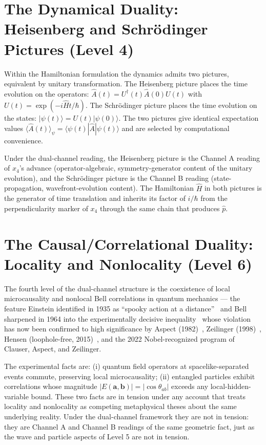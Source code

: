 \documentclass[11pt,a4paper]{article}
\begin{document}
\section{The Dynamical Duality: Heisenberg and Schr\"odinger Pictures (Level 4)}
\label{sec:dynamical}

Within the Hamiltonian formulation the dynamics admits two pictures, equivalent by unitary transformation. The Heisenberg picture places the time evolution on the operators: $\hat{A}(t) = U^\dagger(t) \hat{A}(0) U(t)$ with $U(t) = \exp(-i\hat{H}t/\hbar)$. The Schr\"odinger picture places the time evolution on the states: $|\psi(t)\rangle = U(t)|\psi(0)\rangle$. The two pictures give identical expectation values $\langle \hat{A}(t) \rangle_\psi = \langle \psi(t) | \hat{A} | \psi(t) \rangle$ and are selected by computational convenience.

Under the dual-channel reading, the Heisenberg picture is the Channel A reading of $x_4$'s advance (operator-algebraic, symmetry-generator content of the unitary evolution), and the Schr\"odinger picture is the Channel B reading (state-propagation, wavefront-evolution content). The Hamiltonian $\hat{H}$ in both pictures is the generator of time translation and inherits its factor of $i/\hbar$ from the perpendicularity marker of $x_4$ through the same chain that produces $\hat{p}$.

\section{The Causal/Correlational Duality: Locality and Nonlocality (Level 6)}
\label{sec:causal}

The fourth level of the dual-channel structure is the coexistence of local microcausality and nonlocal Bell correlations in quantum mechanics --- the feature Einstein identified in 1935 as ``spooky action at a distance''~\cite{EPR1935} and Bell sharpened in 1964 into the experimentally decisive inequality~\cite{bell1964} whose violation has now been confirmed to high significance by Aspect (1982)~\cite{aspect1982}, Zeilinger (1998)~\cite{zeilinger1998}, Hensen (loophole-free, 2015)~\cite{hensen2015}, and the 2022 Nobel-recognized program of Clauser, Aspect, and Zeilinger.

The experimental facts are: (i) quantum field operators at spacelike-separated events commute, preserving local microcausality; (ii) entangled particles exhibit correlations whose magnitude $|E(\mathbf{a}, \mathbf{b})| = |\cos\theta_{ab}|$ exceeds any local-hidden-variable bound. These two facts are in tension under any account that treats locality and nonlocality as competing metaphysical theses about the same underlying reality. Under the dual-channel framework they are not in tension: they are Channel A and Channel B readings of the same geometric fact, just as the wave and particle aspects of Level 5 are not in tension.
\end{document}
